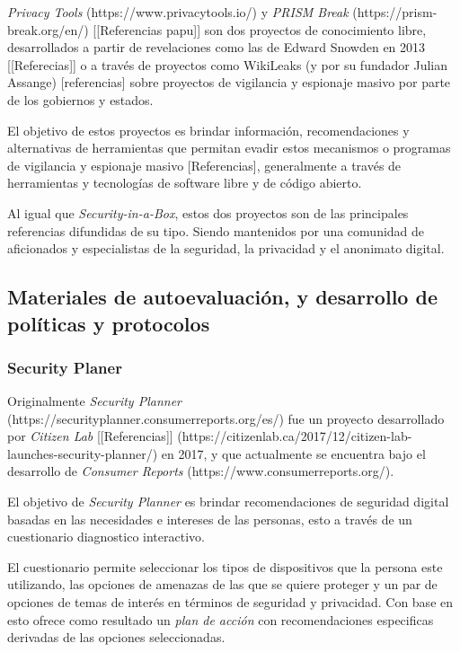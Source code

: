 \documentclass[12pt]{caltech_thesis}
\begin{document}
\textit{Privacy Tools} (https://www.privacytools.io/) y \textit{PRISM Break} (https://prism-break.org/en/) [[Referencias papu]] son dos proyectos de conocimiento libre, desarrollados a partir de revelaciones como las de Edward Snowden en 2013 [[Referecias]] o a través de proyectos como WikiLeaks (y por su fundador Julian Assange) [referencias] sobre proyectos de vigilancia y espionaje masivo por parte de los gobiernos y estados.

El objetivo de estos proyectos es brindar información, recomendaciones y alternativas de herramientas que permitan evadir estos mecanismos o programas de vigilancia y espionaje masivo [Referencias], generalmente a través de herramientas y tecnologías de software libre y de código abierto.

Al igual que \textit{Security-in-a-Box}, estos dos proyectos son de las principales referencias difundidas de su tipo. Siendo mantenidos por una comunidad de aficionados y especialistas de la seguridad, la privacidad y el anonimato digital.

\subsection{Materiales de autoevaluación, y desarrollo de políticas y protocolos}

\subsubsection{Security Planer}

Originalmente \textit{Security Planner} (https://securityplanner.consumerreports.org/es/) fue un proyecto desarrollado por \textit{Citizen Lab} [[Referencias]] (https://citizenlab.ca/2017/12/citizen-lab-launches-security-planner/) en 2017, y que actualmente se encuentra bajo el desarrollo de \textit{Consumer Reports} (https://www.consumerreports.org/).

El objetivo de \textit{Security Planner} es brindar recomendaciones de seguridad digital basadas en las necesidades e intereses de las personas, esto a través de un cuestionario diagnostico interactivo.

El cuestionario permite seleccionar los tipos de dispositivos que la persona este utilizando, las opciones de amenazas de las que se quiere proteger y un par de opciones de temas de interés en términos de seguridad y privacidad. Con base en esto ofrece como resultado un \textit{plan de acción} con recomendaciones especificas derivadas de las opciones seleccionadas.
\end{document}
